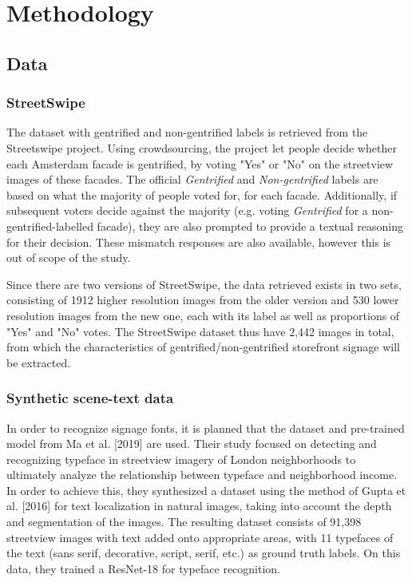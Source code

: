 \section{Methodology}
\label{sec:methodology}

\subsection{Data}
\subsubsection{StreetSwipe}
The dataset with gentrified and non-gentrified labels is retrieved from the Streetswipe project. Using crowdsourcing, the project let people decide whether each Amsterdam facade is gentrified, by voting "Yes" or "No" on the streetview images of these facades. The official \textit{Gentrified} and \textit{Non-gentrified} labels are based on what the majority of people voted for, for each facade. Additionally, if subsequent voters decide against the majority (e.g. voting \textit{Gentrified} for a non-gentrified-labelled facade), they are also prompted to provide a textual reasoning for their decision. These mismatch responses are also available, however this is out of scope of the study. 

Since there are two versions of StreetSwipe, the data retrieved exists in two sets, consisting of 1912 higher resolution images from the older version and 530 lower resolution images from the new one, each with its label as well as proportions of "Yes" and "No" votes. The StreetSwipe dataset thus have 2,442 images in total, from which the characteristics of gentrified/non-gentrified storefront signage will be extracted.

\subsubsection{Synthetic scene-text data}
In order to recognize signage fonts, it is planned that the dataset and pre-trained model from Ma et al. [2019] \cite{ma2019} are used. Their study focused on detecting and recognizing typeface in streetview imagery of London neighborhoods to ultimately analyze the relationship between typeface and neighborhood income. In order to achieve this, they synthesized a dataset using the method of Gupta et al. [2016] \cite{gupta2016} for text localization in natural images, taking into account the depth and segmentation of the images. The resulting dataset consists of 91,398 streetview images with text added onto appropriate areas, with 11 typefaces of the text (sans serif, decorative, script, serif, etc.) as ground truth labels. On this data, they trained a ResNet-18 for typeface recognition. 

